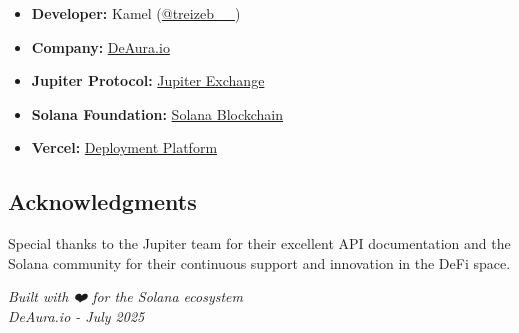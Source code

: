 \documentclass[11pt,a4paper]{article}
\begin{document}
\begin{itemize}
    \item \textbf{Developer:} Kamel (\href{https://x.com/treizeb__}{@treizeb\_\_})
    \item \textbf{Company:} \href{https://deaura.io}{DeAura.io}
    \item \textbf{Jupiter Protocol:} \href{https://jup.ag}{Jupiter Exchange}
    \item \textbf{Solana Foundation:} \href{https://solana.org}{Solana Blockchain}
    \item \textbf{Vercel:} \href{https://vercel.com}{Deployment Platform}
\end{itemize}

\subsection{Acknowledgments}

Special thanks to the Jupiter team for their excellent API documentation and the Solana community for their continuous support and innovation in the DeFi space.

\vspace{1cm}

\begin{center}
\textit{Built with ❤️ for the Solana ecosystem}\\
\textit{DeAura.io - July 2025}
\end{center}
\end{document}
